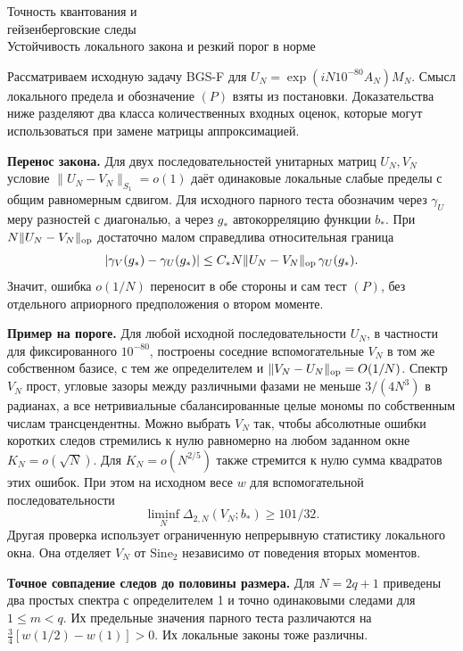 \documentclass[11pt,a4paper]{article}
\newcommand{\si}{\mathrm{Sine}_2}
\newcommand{\subt}[1]{\par\medskip\noindent\textbf{#1.}\quad}
\begin{document}
\begin{center}{\LARGE\sffamily Точность квантования и\\[3pt]гейзенберговские следы}\\[6pt]
{\large Устойчивость локального закона и резкий порог в норме}
\end{center}
Рассматриваем исходную задачу BGS-F для \(U_N=\exp(iN10^{-80} A_N)M_N\). Смысл локального предела и обозначение \((P)\) взяты из постановки. Доказательства ниже разделяют два класса количественных входных оценок, которые могут использоваться при замене матрицы аппроксимацией.

\subt{Перенос закона}
Для двух последовательностей унитарных матриц \(U_N,V_N\) условие \(\|U_N-V_N\|_{S_1}=o(1)\) даёт одинаковые локальные слабые пределы с общим равномерным сдвигом. Для исходного парного теста обозначим через \(\gamma_U\) меру разностей с диагональю, а через \(g_*\) автокорреляцию функции \(b_*\). При \(N\|U_N-V_N\|_{\rm op}\) достаточно малом справедлива относительная граница
\[
    |\gamma_V(g_*)-\gamma_U(g_*)|
       \le C_*N\|U_N-V_N\|_{\rm op}\,\gamma_U(g_*).
\]
Значит, ошибка \(o(1/N)\) переносит в обе стороны и сам тест \((P)\), без отдельного априорного предположения о втором моменте.

\subt{Пример на пороге}
Для любой исходной последовательности \(U_N\), в частности для фиксированного \(10^{-80}\), построены соседние вспомогательные \(V_N\) в том же собственном базисе, с тем же определителем и \(\|V_N-U_N\|_{\rm op}=O(1/N)\). Спектр \(V_N\) прост, угловые зазоры между различными фазами не меньше \(3/(4N^3)\) в радианах, а все нетривиальные сбалансированные целые мономы по собственным числам трансцендентны. Можно выбрать \(V_N\) так, чтобы абсолютные ошибки коротких следов стремились к нулю равномерно на любом заданном окне \(K_N=o(\sqrt N)\). Для \(K_N=o(N^{2/5})\) также стремится к нулю сумма квадратов этих ошибок. При этом на исходном весе \(w\) для вспомогательной последовательности
\[
                     \liminf_N\Delta_{2,N}(V_N;b_*)\ge101/32 .
\]
Другая проверка использует ограниченную непрерывную статистику локального окна. Она отделяет \(V_N\) от \(\si\) независимо от поведения вторых моментов.

\subt{Точное совпадение следов до половины размера}
Для \(N=2q+1\) приведены два простых спектра с определителем 1 и точно одинаковыми следами для \(1\le m<q\). Их предельные значения парного теста различаются на \(\tfrac34[w(1/2)-w(1)]>0\). Их локальные законы тоже различны.
\end{document}
